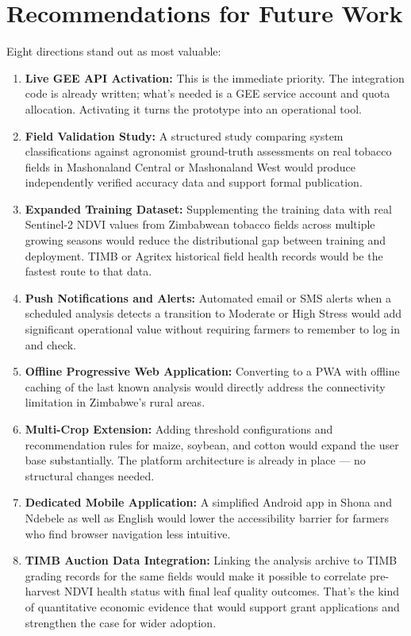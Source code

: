 \section{Recommendations for Future Work}

Eight directions stand out as most valuable:

\begin{enumerate}
  \item \textbf{Live GEE API Activation:} This is the immediate priority. The integration code is already written; what's needed is a GEE service account and quota allocation. Activating it turns the prototype into an operational tool.

  \item \textbf{Field Validation Study:} A structured study comparing system classifications against agronomist ground-truth assessments on real tobacco fields in Mashonaland Central or Mashonaland West would produce independently verified accuracy data and support formal publication.

  \item \textbf{Expanded Training Dataset:} Supplementing the training data with real Sentinel-2 NDVI values from Zimbabwean tobacco fields across multiple growing seasons would reduce the distributional gap between training and deployment. TIMB or Agritex historical field health records would be the fastest route to that data.

  \item \textbf{Push Notifications and Alerts:} Automated email or SMS alerts when a scheduled analysis detects a transition to Moderate or High Stress would add significant operational value without requiring farmers to remember to log in and check.

  \item \textbf{Offline Progressive Web Application:} Converting to a PWA with offline caching of the last known analysis would directly address the connectivity limitation in Zimbabwe's rural areas.

  \item \textbf{Multi-Crop Extension:} Adding threshold configurations and recommendation rules for maize, soybean, and cotton would expand the user base substantially. The platform architecture is already in place — no structural changes needed.

  \item \textbf{Dedicated Mobile Application:} A simplified Android app in Shona and Ndebele as well as English would lower the accessibility barrier for farmers who find browser navigation less intuitive.

  \item \textbf{TIMB Auction Data Integration:} Linking the analysis archive to TIMB grading records for the same fields would make it possible to correlate pre-harvest NDVI health status with final leaf quality outcomes. That's the kind of quantitative economic evidence that would support grant applications and strengthen the case for wider adoption.
\end{enumerate}

